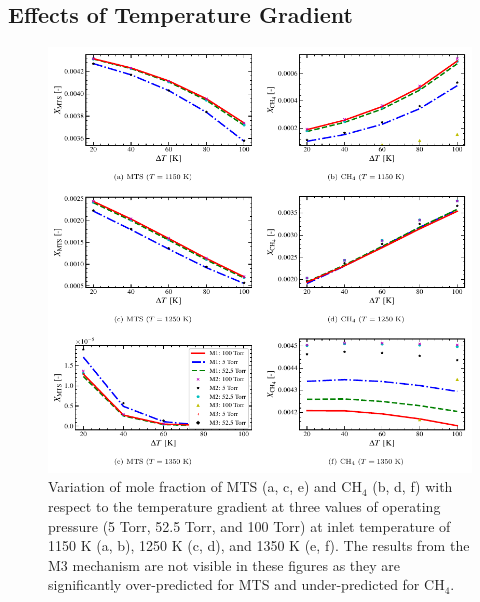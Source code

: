 \documentclass[final, letterpaper, square, comma, numbers, sort&compress]{elsarticle}
\begin{document}
\subsection{Effects of Temperature Gradient}
\begin{figure}[p]
    \centering\includegraphics[width=\textwidth]{ph-fig8.png}
    \caption{Variation of mole fraction of MTS (a, c, e) and CH$_4$ (b, d, f) with respect to the temperature gradient at three values of operating pressure (5 Torr, 52.5 Torr, and 100 Torr) at inlet temperature of 1150 K (a, b), 1250 K (c, d), and 1350 K (e, f). The results from the M3 mechanism are not visible in these figures as they are significantly over-predicted for MTS and under-predicted for CH$_4$.}
    \label{fig:8}
\end{figure}
\end{document}

